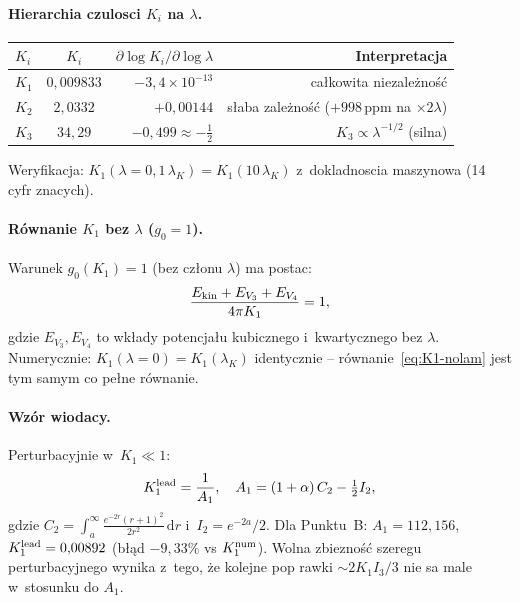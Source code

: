 \paragraph{Hierarchia czulosci $K_i$ na $\lambda$.}
\begin{center}
\begin{tabular}{lcrr}
\hline
$K_i$ & $K_i$ & $\partial\log K_i/\partial\log\lambda$ & Interpretacja \\
\hline
$K_1$ & $0{,}009833$ & $-3{,}4\times10^{-13}$ & ca\l{}kowita niezale\.zno\'s\'c \\
$K_2$ & $2{,}0332$   & $+0{,}00144$           & s\l{}aba zale\.zno\'s\'c ($+998\,\mathrm{ppm}$ na $\times2\lambda$) \\
$K_3$ & $34{,}29$    & $-0{,}499\approx-\tfrac{1}{2}$ & $K_3\propto\lambda^{-1/2}$ (silna) \\
\hline
\end{tabular}
\end{center}
Weryfikacja: $K_1(\lambda=0{,}1\,\lambda_K) = K_1(10\,\lambda_K)$
z~dokladnoscia maszynowa (14 cyfr znacych).

\paragraph{R\'ownanie $K_1$ bez $\lambda$ ($g_0=1$).}
Warunek $g_0(K_1)=1$ (bez cz\l{}onu $\lambda$) ma postac:
\begin{equation}
  \frac{E_{\rm kin} + E_{V_3} + E_{V_4}}{4\pi K_1} = 1,
  \label{eq:K1-nolam}
\end{equation}
gdzie $E_{V_3}, E_{V_4}$ to wk\l{}ady potencja\l{}u kubicznego
i~kwartycznego bez $\lambda$.
Numerycznie: $K_1(\lambda=0) = K_1(\lambda_K)$ identycznie --
r\'ownanie~\eqref{eq:K1-nolam} jest tym samym co pe\l{}ne r\'ownanie.

\paragraph{Wz\'or wiodacy.}
Perturbacyjnie w~$K_1\ll1$:
\begin{equation}
  K_1^{\rm lead} = \frac{1}{A_1},\quad
  A_1 = (1+\alpha)\,C_2 - \tfrac{1}{2}I_2,
  \label{eq:K1-leading}
\end{equation}
gdzie $C_2 = \int_a^\infty \tfrac{e^{-2r}(r+1)^2}{2r^2}\,\mathrm{d}r$
i~$I_2 = e^{-2a}/2$.
Dla Punktu~B: $A_1=112{,}156$, $K_1^{\rm lead}=0{,}00892$
(b\l{}\k{a}d $-9{,}33\%$ vs $K_1^{\rm num}$).
Wolna zbiezno\'s\'c szeregu perturbacyjnego wynika z~tego,
\.ze kolejne pop rawki $\sim 2K_1 I_3/3$ nie sa male
w~stosunku do $A_1$.

